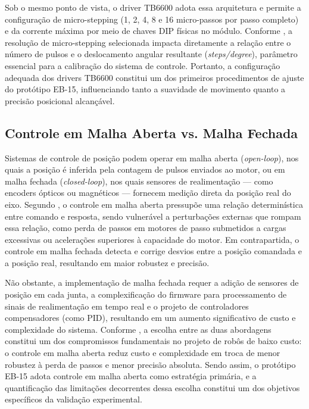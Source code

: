 Sob o mesmo ponto de vista, o driver TB6600 adota essa arquitetura e permite a configuração de micro-stepping (1, 2, 4, 8 e 16 micro-passos por passo completo) e da corrente máxima por meio de chaves DIP físicas no módulo. Conforme , a resolução de micro-stepping selecionada impacta diretamente a relação entre o número de pulsos e o deslocamento angular resultante (\textit{steps/degree}), parâmetro essencial para a calibração do sistema de controle. Portanto, a configuração adequada dos drivers TB6600 constitui um dos primeiros procedimentos de ajuste do protótipo EB-15, influenciando tanto a suavidade de movimento quanto a precisão posicional alcançável.

\subsection{Controle em Malha Aberta vs. Malha Fechada}

Sistemas de controle de posição podem operar em malha aberta (\textit{open-loop}), nos quais a posição é inferida pela contagem de pulsos enviados ao motor, ou em malha fechada (\textit{closed-loop}), nos quais sensores de realimentação — como encoders ópticos ou magnéticos — fornecem medição direta da posição real do eixo. Segundo , o controle em malha aberta pressupõe uma relação determinística entre comando e resposta, sendo vulnerável a perturbações externas que rompam essa relação, como perda de passos em motores de passo submetidos a cargas excessivas ou acelerações superiores à capacidade do motor. Em contrapartida, o controle em malha fechada detecta e corrige desvios entre a posição comandada e a posição real, resultando em maior robustez e precisão.

Não obstante, a implementação de malha fechada requer a adição de sensores de posição em cada junta, a complexificação do firmware para processamento de sinais de realimentação em tempo real e o projeto de controladores compensadores (como PID), resultando em um aumento significativo de custo e complexidade do sistema. Conforme , a escolha entre as duas abordagens constitui um dos compromissos fundamentais no projeto de robôs de baixo custo: o controle em malha aberta reduz custo e complexidade em troca de menor robustez à perda de passos e menor precisão absoluta. Sendo assim, o protótipo EB-15 adota controle em malha aberta como estratégia primária, e a quantificação das limitações decorrentes dessa escolha constitui um dos objetivos específicos da validação experimental.

